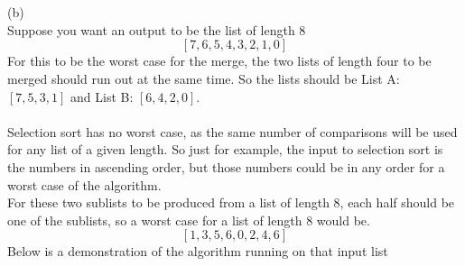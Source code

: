 \documentclass{article}[18pt]
\begin{document}
\section{}
(b)\\
Suppose you want an output to be the list of length 8
$$[7,6,5,4,3,2,1,0]$$
For this to be the worst case for the merge, the two lists of length four to be merged should run out at the same time. So the lists should be List A: $[7,5,3,1]$ and List B: $[6,4,2,0]$.\\
\\
Selection sort has no worst case, as the same number of comparisons will be used for any list of a given length. So just for example, the input to selection sort is the numbers in ascending order, but those numbers could be in any order for a worst case of the algorithm.
\\
For these two sublists to be produced from a list of length 8, each half should be one of the sublists, so a worst case for a list of length 8 would be.
$$[1,3,5,6,0,2,4,6]$$
Below is a demonstration of the algorithm running on that input list
\begin{center}


\end{center}
\end{document}
